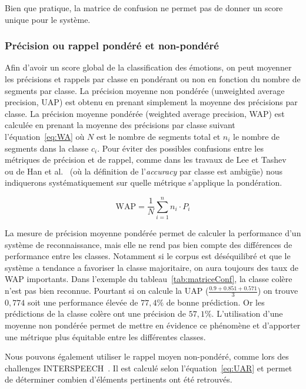 Bien que pratique, la matrice de confusion ne permet pas de donner un score unique pour le système.


\subsubsection{Précision ou rappel pondéré et non-pondéré}

Afin d'avoir un score global de la classification des émotions, on peut moyenner les précisions et rappels par classe en pondérant ou non en fonction du nombre de segments par classe. La précision moyenne non pondérée (unweighted average precision, UAP) est obtenu en prenant simplement la moyenne des précisions par classe.
La précision moyenne pondérée (weighted average precision, WAP) est calculée en prenant la moyenne des précisions par classe suivant l'équation~\ref{eq:WA} où $N$ est le nombre de segments total et $n_i$ le nombre de segments dans la classe $c_i$. Pour éviter des possibles confusions entre les métriques de précision et de rappel, comme dans les travaux de Lee et Tashev~\cite{Lee2015} ou de Han et al.~\cite{Han2014} (où la définition de l'\textit{accuracy} par classe est ambigüe) nous indiquerons systématiquement sur quelle métrique s'applique la pondération.


\begin{equation}
  \text{WAP} = \dfrac{1}{N}\sum^n_{i=1}n_i \cdot P_i
  \label{eq:WA}
\end{equation}

La mesure de précision moyenne pondérée permet de calculer la performance d'un système de reconnaissance, mais elle ne rend pas bien compte des différences de performance entre les classes. Notamment si le corpus est déséquilibré et que le système a tendance a favoriser la classe majoritaire, on aura toujours des taux de WAP importants. Dans l'exemple du tableau~\ref{tab:matriceConf}, la classe colère n'est pas bien reconnue. Pourtant si on calcule la UAP ($\frac{0.9+0.851+0.571}{3}$) on trouve $0,774$ soit une performance élevée de $77,4\%$ de bonne prédiction. Or les prédictions de la classe colère ont une précision de $57,1\%$. L'utilisation d'une moyenne non pondérée permet de mettre en évidence ce phénomène et d'apporter une métrique plus équitable entre les différentes classes.

Nous pouvons également utiliser le rappel moyen non-pondéré, comme lors des challenges INTERSPEECH~\cite{Schuller2009,Schuller2011}. Il est calculé selon l'équation~\ref{eq:UAR} et permet de déterminer combien d'éléments pertinents ont été retrouvés.

